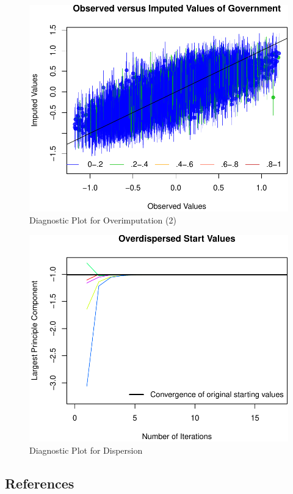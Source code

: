 \documentclass[12pt,]{article}
\begin{document}
\begin{figure}[htbp]
\centering
\includegraphics{figures/missing5-1.pdf}
\caption{Diagnostic Plot for Overimputation (2)}
\end{figure}

\clearpage

\begin{figure}[htbp]
\centering
\includegraphics{figures/missing6-1.pdf}
\caption{Diagnostic Plot for Dispersion}
\end{figure}

\clearpage

\subsection{References}\label{references}
\end{document}
